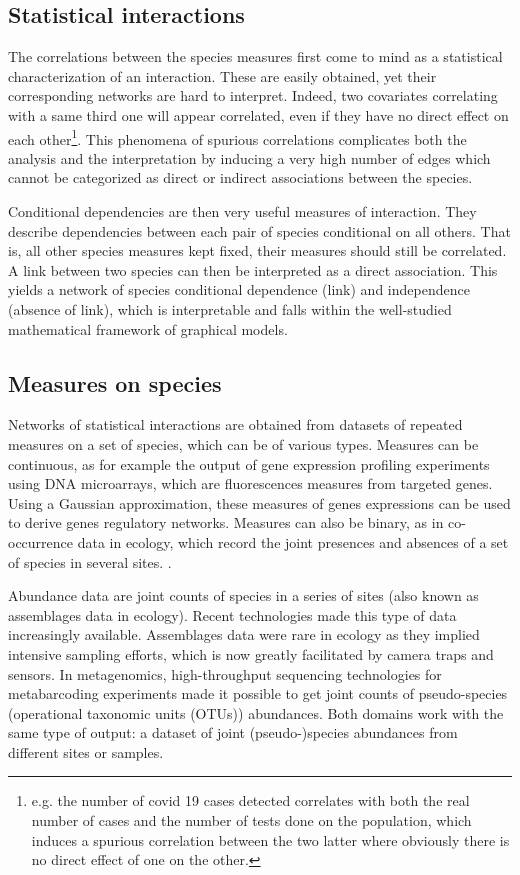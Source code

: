   \subsection*{Statistical interactions}
The correlations between the species measures first come to mind as a statistical characterization of an interaction. These are easily obtained, yet their corresponding networks are hard to interpret. Indeed, two covariates correlating with a same third one will appear correlated, even if they have no direct effect on each other\footnote{e.g. the number of covid 19 cases detected correlates with both the real number of cases and the number of tests done on the population, which induces a spurious correlation between the two latter where obviously there is no direct effect of one on the other.}. This phenomena of spurious correlations complicates both the analysis and the interpretation by inducing a very high number of edges  which cannot be categorized as direct or indirect associations between the species. 
 
 Conditional dependencies are then very useful measures of interaction. They describe dependencies between each pair of species conditional on all others. That is, all other species measures kept fixed, their measures should still be correlated. A link between two species can then be interpreted as a direct association. This yields a network of species conditional dependence (link) and independence (absence of link), which is interpretable and falls within the well-studied mathematical framework of graphical models.
 
 \subsection*{Measures on species}
 Networks of statistical interactions are obtained from datasets of repeated measures on a set of species, which can be of various types. Measures can be continuous, as for example the output of gene expression profiling experiments using DNA microarrays, which  are  fluorescences measures from targeted genes. Using a Gaussian approximation, these measures of genes expressions can be used to derive genes regulatory networks.  Measures can also be binary, as in co-occurrence data in ecology, which record the joint presences and absences of a set of species in several sites. \citet{CAM16}.

Abundance data  are joint counts of species in a series of sites (also known as assemblages data in ecology). Recent technologies made this type of data increasingly available. Assemblages data were rare in ecology as they implied intensive sampling efforts, which is now greatly facilitated by camera traps and sensors. In metagenomics, high-throughput sequencing technologies for metabarcoding experiments made it possible  to get joint counts of pseudo-species (operational taxonomic units (OTUs)) abundances.  Both domains work with the same type of output: a dataset of joint (pseudo-)species abundances from different sites or samples.\\



